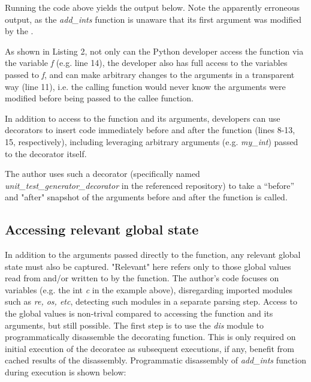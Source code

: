 

Running the code above yields the output below. Note the apparently erroneous
output, as the \textit{add\_ints} function is unaware that its first argument was
modified by the .



As shown in Listing 2, not only can the Python developer access the function
via the variable \textit{f} (e.g. line 14), the developer also has full
access to the variables passed to \textit{f}, and can make 
arbitrary changes to the arguments in a transparent way (line 11), 
i.e. the calling function would never know the arguments 
were modified before being passed to the callee function.

In addition to access to the function and its arguments,
developers can use decorators to insert code immediately before and after 
the function (lines 8-13, 15, respectively), including leveraging arbitrary
arguments (e.g. \textit{my\_int}) passed to the decorator itself.

The author uses such a decorator (specifically named 
\break
\textit{unit\_test\_generator\_decorator} in the referenced repository) to take
 a “before” and "after" snapshot of the arguments
before and after the function is called.

%
\subsection{Accessing relevant global state}\label{sec:approach-internal-2}

In addition to the arguments passed directly to the function, any relevant 
global state must also be captured. "Relevant" here refers only to those 
global values read from and/or written to by the function.
The author's code focuses on variables (e.g. the int \textit{c} in the example above), 
disregarding imported modules such as \textit{re, os, etc}, detecting such
modules in a separate parsing step.
Access to the global values is non-trival compared to accessing the function 
and its arguments, but still possible.  The first step is to use the \textit{dis}
module to programmatically disassemble the decorating function.  This is only 
required on initial execution of the decoratee as subsequent executions, if any, 
benefit from cached results of the disassembly.
Programmatic disassembly of \textit{add\_ints} function during execution is shown below:

